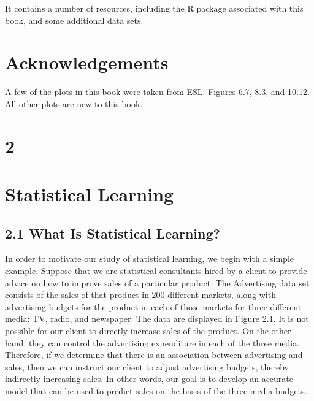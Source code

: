\documentclass[10pt]{article}
\begin{document}
It contains a number of resources, including the R package associated with this book, and some additional data sets.

\section*{Acknowledgements}
A few of the plots in this book were taken from ESL: Figures 6.7, 8.3, and 10.12. All other plots are new to this book.

\section*{2}
\section*{Statistical Learning}
\subsection*{2.1 What Is Statistical Learning?}
In order to motivate our study of statistical learning, we begin with a simple example. Suppose that we are statistical consultants hired by a client to provide advice on how to improve sales of a particular product. The Advertising data set consists of the sales of that product in 200 different markets, along with advertising budgets for the product in each of those markets for three different media: TV, radio, and newspaper. The data are displayed in Figure 2.1. It is not possible for our client to directly increase sales of the product. On the other hand, they can control the advertising expenditure in each of the three media. Therefore, if we determine that there is an association between advertising and sales, then we can instruct our client to adjust advertising budgets, thereby indirectly increasing sales. In other words, our goal is to develop an accurate model that can be used to predict sales on the basis of the three media budgets.
\end{document}
